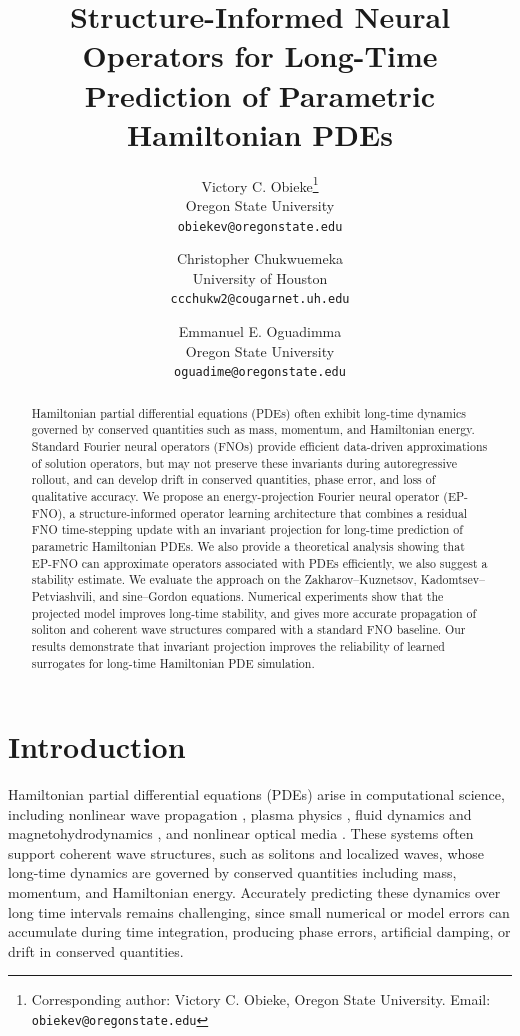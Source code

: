 \documentclass[11pt,a4paper]{article}
\title{\bf Structure-Informed Neural Operators for Long-Time Prediction of Parametric Hamiltonian PDEs}
\author{
Victory C. Obieke\thanks{Corresponding author: Victory C. Obieke,  Oregon State University. Email: \texttt{obiekev@oregonstate.edu}}\\
Oregon State University\\
\texttt{obiekev@oregonstate.edu}
\and
Christopher Chukwuemeka\\
University of Houston\\
\texttt{ccchukw2@cougarnet.uh.edu}
\and
Emmanuel E. Oguadimma\\
Oregon State University\\
\texttt{oguadime@oregonstate.edu}
}
\theoremstyle{definition}
\theoremstyle{remark}
\numberwithin{equation}{section}
\numberwithin{figure}{section}
\numberwithin{table}{section}
\begin{document}
\date{}
\maketitle

\begin{abstract}
Hamiltonian partial differential equations (PDEs) often exhibit long-time dynamics governed by conserved quantities such as mass, momentum, and Hamiltonian energy. Standard Fourier neural operators (FNOs) provide efficient data-driven approximations of solution operators, but may not preserve these invariants during autoregressive rollout, and can develop drift in conserved quantities, phase error, and loss of qualitative accuracy. We propose an energy-projection Fourier neural operator (EP-FNO), a structure-informed operator learning architecture that combines a residual FNO time-stepping update with an invariant projection for long-time prediction of parametric Hamiltonian PDEs. We also provide a theoretical analysis showing that EP-FNO can approximate operators
associated with PDEs efficiently, we also suggest a stability estimate.
 We evaluate the approach on the Zakharov--Kuznetsov, Kadomtsev--Petviashvili, and sine--Gordon equations. Numerical experiments show that the projected model improves long-time stability, and gives more accurate propagation of soliton and coherent wave structures compared with a standard FNO baseline. Our results demonstrate that invariant projection improves the reliability of learned surrogates for long-time Hamiltonian PDE simulation.
\end{abstract}

\section{Introduction}

Hamiltonian partial differential equations (PDEs) arise in computational science, including nonlinear wave propagation \cite{whitham1974linear,drazin1989solitons,sulem1999nonlinear}, plasma physics \cite{morrison2005hamiltonian}, fluid dynamics and magnetohydrodynamics \cite{morrison1980noncanonical,morrison1998hamiltonian}, and nonlinear optical media \cite{boyd2020nonlinear,agrawal2019nonlinear}.
These systems often support coherent wave structures, such as solitons and localized waves, whose long-time dynamics are governed by conserved quantities including mass, momentum, and Hamiltonian energy. Accurately predicting these dynamics over long time intervals remains challenging, since small numerical or model errors can accumulate during time integration, producing phase errors, artificial damping, or drift in conserved quantities.
\end{document}

